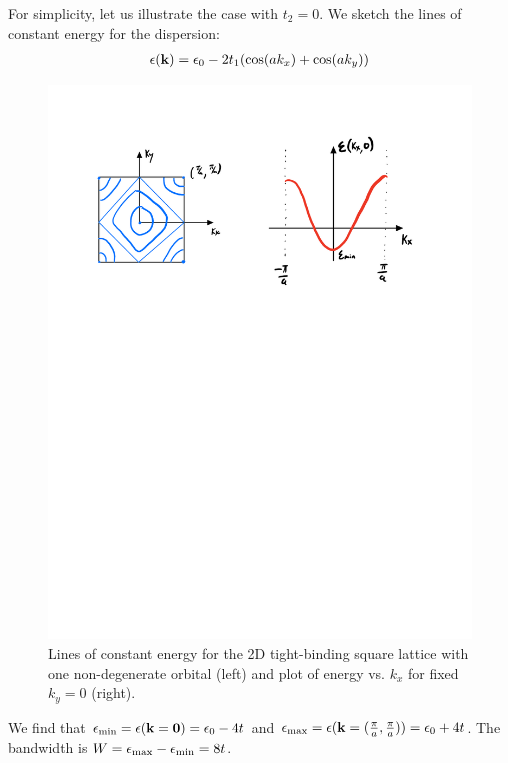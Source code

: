 For simplicity, let us illustrate the case with $t_2 = 0$. We sketch the lines of constant energy for the dispersion:
\begin{align*}
    \epsilon(\mathbf{k}) = \epsilon_0 - 2t_1(\cos(ak_x) + \cos(ak_y))
\end{align*}

\begin{figure}[htbp]
    \centering
    \includegraphics[scale=0.7]{Images/fig-2dtightbindingsquarelatticedispersion.pdf}
    
    \caption{Lines of constant energy for the 2D tight-binding square lattice with one non-degenerate orbital (left) and plot of energy vs. $k_x$ for fixed $k_y = 0$ (right).}
    \label{fig-2dtightbindingsquarelatticedispersion}
\end{figure}

We find that $\epsilon_{\text{min}} = \epsilon(\mathbf{k} = \mathbf{0}) = \epsilon_0 - 4t$ and $\epsilon_{\text{max}} = \epsilon(\mathbf{k} = (\frac{\pi}{a}, \frac{\pi}{a})) = \epsilon_0 + 4t$. The bandwidth is $W = \epsilon_{\text{max}} - \epsilon_{\text{min}} = 8t$. 